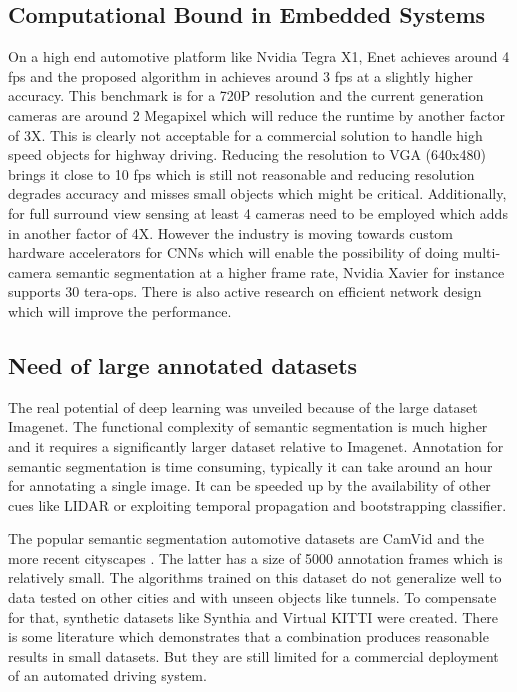 \documentclass[conference]{IEEEtran}
\begin{document}
\subsection{Computational Bound in Embedded Systems}
On a high end automotive platform like Nvidia Tegra X1, Enet \cite{paszke2016enet} achieves around 4 fps and the proposed algorithm in \cite{tremlspeeding} achieves around 3 fps at a slightly higher accuracy. This benchmark is for a 720P resolution and the current generation cameras are around 2 Megapixel which will reduce the runtime by another factor of 3X. This is clearly not acceptable for a commercial solution to handle high speed objects for highway driving. Reducing the resolution to VGA (640x480) brings it close to 10 fps which is still not reasonable and reducing resolution degrades accuracy and misses small objects which might be critical. Additionally, for full surround view sensing at least 4 cameras need to be employed which adds in another factor of 4X. However the industry is moving towards custom hardware accelerators for CNNs which will enable the possibility of doing multi-camera semantic segmentation at a higher frame rate, Nvidia Xavier for instance supports 30 tera-ops. There is also active research on efficient network design which will improve the performance.

\subsection{Need of large annotated datasets}
The real potential of deep learning was unveiled because of the large dataset Imagenet\cite{imagenet_cvpr09}. The functional complexity of semantic segmentation is much higher and it requires a significantly larger dataset relative to Imagenet. Annotation for semantic segmentation is time consuming, typically it can take around an hour for annotating a single image. It can be speeded up by the availability of other cues like LIDAR or exploiting temporal propagation and bootstrapping classifier.

The popular semantic segmentation automotive datasets are CamVid \cite{brostow2008segmentation} and the more recent cityscapes \cite{cordts2016cityscapes}. The latter has a size of 5000 annotation frames which is relatively small. The algorithms trained on this dataset do not generalize well to data tested on other cities and with unseen objects like tunnels. To compensate for that, synthetic datasets like Synthia \cite{ros2016synthia} and Virtual KITTI \cite{gaidon2016virtual} were created. There is some literature which demonstrates that a combination produces reasonable results in small datasets. But they are still limited for a commercial deployment of an automated driving system. 
\end{document}

